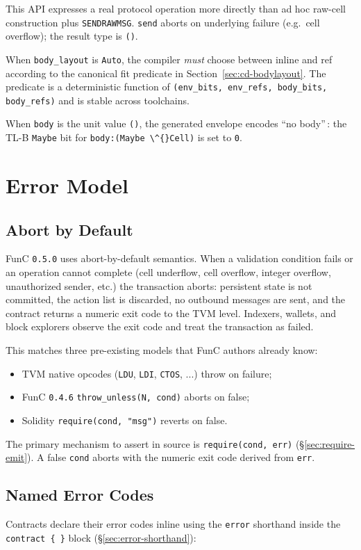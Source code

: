 \documentclass[12pt,oneside]{article}
\begin{document}
This API expresses a real protocol operation more directly than ad
hoc raw-cell construction plus \verb|SENDRAWMSG|. \verb|send| aborts
on underlying failure (e.g.\ cell overflow); the result type is
\verb|()|.

When \verb|body_layout| is \verb|Auto|, the compiler \emph{must}
choose between inline and ref according to the canonical fit predicate
in Section~\ref{sec:cd-bodylayout}. The predicate is a deterministic
function of \verb|(env_bits, env_refs, body_bits, body_refs)| and is
stable across toolchains.

When \verb|body| is the unit value \verb|()|, the generated envelope
encodes ``no body''\,: the TL-B \verb|Maybe| bit for
\verb|body:(Maybe \^{}Cell)| is set to \verb|0|.

\section{Error Model}
\label{sec:error-model}
\subsection{Abort by Default}
FunC \verb|0.5.0| uses abort-by-default semantics. When a validation
condition fails or an operation cannot complete (cell underflow, cell
overflow, integer overflow, unauthorized sender, etc.) the transaction
aborts: persistent state is not committed, the action list is
discarded, no outbound messages are sent, and the contract returns a
numeric exit code to the TVM level. Indexers, wallets, and block
explorers observe the exit code and treat the transaction as failed.

This matches three pre-existing models that FunC authors already know:

\begin{itemize}
\item TVM native opcodes (\verb|LDU|, \verb|LDI|, \verb|CTOS|, ...)
throw on failure;
\item FunC \verb|0.4.6| \verb|throw_unless(N, cond)| aborts on false;
\item Solidity \verb|require(cond, "msg")| reverts on false.
\end{itemize}

The primary mechanism to assert in source is \verb|require(cond, err)|
(\S\ref{sec:require-emit}). A false \verb|cond| aborts with the
numeric exit code derived from \verb|err|.

\subsection{Named Error Codes}
Contracts declare their error codes inline using the \verb|error|
shorthand inside the \verb|contract { }| block
(\S\ref{sec:error-shorthand}):
\end{document}
